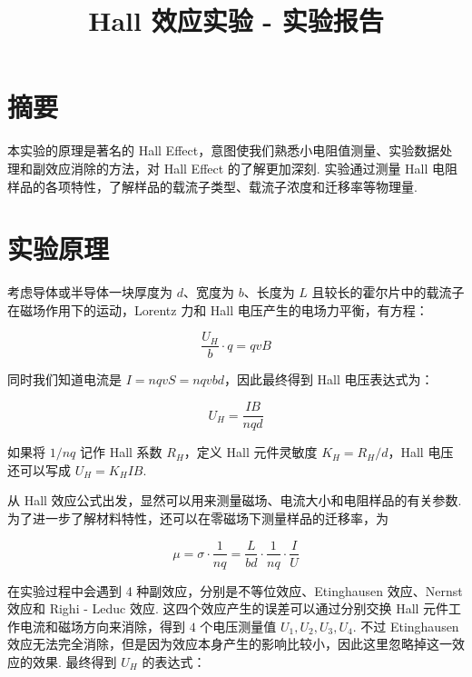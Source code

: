 \documentclass{customDoc}
\begin{document}
\title{Hall 效应实验 - 实验报告}
\maketitle

\section{摘要}

本实验的原理是著名的 Hall Effect，意图使我们熟悉小电阻值测量、实验数据处理和副效应消除的方法，对 Hall Effect 的了解更加深刻. 实验通过测量 Hall 电阻样品的各项特性，了解样品的载流子类型、载流子浓度和迁移率等物理量.

\section{实验原理}

考虑导体或半导体一块厚度为 $d$、宽度为 $b$、长度为 $L$ 且较长的霍尔片中的载流子在磁场作用下的运动，Lorentz 力和 Hall 电压产生的电场力平衡，有方程：

\begin{equation}
    \frac{U_H}{b}\cdot q = qvB
\end{equation}

同时我们知道电流是 $I = nqvS = nqvbd$，因此最终得到 Hall 电压表达式为：

\begin{equation}
    U_H = \frac{IB}{nqd}
\end{equation}

如果将 $1/nq$ 记作 Hall 系数 $R_H$，定义 Hall 元件灵敏度 $K_H = R_H/d$，Hall 电压还可以写成 $U_H = K_HIB$.

从 Hall 效应公式出发，显然可以用来测量磁场、电流大小和电阻样品的有关参数. 为了进一步了解材料特性，还可以在零磁场下测量样品的迁移率，为

\begin{equation}
    \mu = \sigma \cdot \frac{1}{nq} = \frac{L}{bd}\cdot \frac{1}{nq} \cdot\frac{I}{U}
\end{equation}

在实验过程中会遇到 4 种副效应，分别是不等位效应、Etinghausen 效应、Nernst 效应和 Righi - Leduc 效应. 这四个效应产生的误差可以通过分别交换 Hall 元件工作电流和磁场方向来消除，得到 $4$ 个电压测量值 $U_1,U_2,U_3,U_4$. 不过 Etinghausen 效应无法完全消除，但是因为效应本身产生的影响比较小，因此这里忽略掉这一效应的效果. 最终得到 $U_H$ 的表达式：
\end{document}

